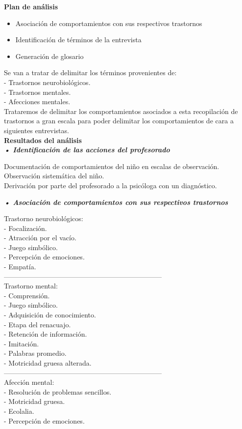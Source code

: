 \documentclass[letterpaper,12pt]{article}
\begin{document}
\textbf{Plan de análisis} \\
\begin{itemize}
    \item Asociación de comportamientos con sus respectivos trastornos
    \item Identificación de términos de la entrevista
    \item Generación de glosario
\end{itemize}
Se van a tratar de delimitar los términos provenientes de:\\
- Trastornos neurobiológicos.\\
- Trastornos mentales.\\
- Afecciones mentales.\\
Trataremos de delimitar los comportamientos asociados a esta
recopilación de trastornos a gran escala para poder delimitar los
comportamientos de cara a siguientes entrevistas. \\
\textbf{Resultados del análisis} \\
\textit{\textbf{• Identificación de las acciones del profesorado}}
\begin{flushleft}
Documentación de comportamientos del niño en escalas de observación. \\
Observación sistemática del niño. \\
Derivación por parte del profesorado a la psicóloga con un diagnóstico. \\
\end{flushleft}
\textit{\textbf{• Asociación de comportamientos con sus respectivos trastornos}}

Trastorno neurobiológicos: \\
- Focalización. \\
- Atracción por el vacío. \\
- Juego simbólico. \\
- Percepción de emociones. \\
- Empatía. \\
--------------------------------------------------------------------- \\
Trastorno mental: \\
- Comprensión. \\
- Juego simbólico. \\
- Adquisición de conocimiento. \\
- Etapa del renacuajo. \\
- Retención de información. \\
- Imitación. \\
- Palabras promedio. \\
- Motricidad gruesa alterada. \\
--------------------------------------------------------------------- \\
Afección mental: \\
- Resolución de problemas sencillos.\\
- Motricidad gruesa.\\
- Ecolalia.\\
- Percepción de emociones.\\
\end{document}
